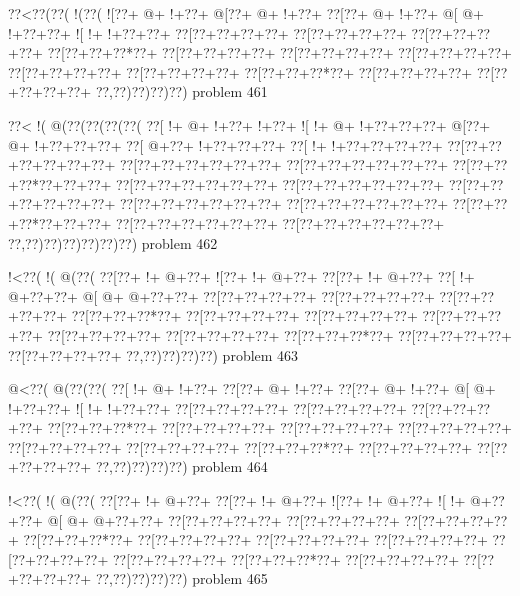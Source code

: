 \vbox{\vbox{\goo
\0??<\0??(\0??(\- !(\0??(
\- ![\0??+\- @+\- !+\0??+
\- @[\0??+\- @+\- !+\0??+
\0??[\0??+\- @+\- !+\0??+
\- @[\- @+\- !+\0??+\0??+
\- ![\- !+\- !+\0??+\0??+
\0??[\0??+\0??+\0??+\0??+
\0??[\0??+\0??+\0??+\0??+
\0??[\0??+\0??+\0??+\0??+
\0??[\0??+\0??+\0??*\0??+
\0??[\0??+\0??+\0??+\0??+
\0??[\0??+\0??+\0??+\0??+
\0??[\0??+\0??+\0??+\0??+
\0??[\0??+\0??+\0??+\0??+
\0??[\0??+\0??+\0??+\0??+
\0??[\0??+\0??+\0??*\0??+
\0??[\0??+\0??+\0??+\0??+
\0??[\0??+\0??+\0??+\0??+
\0??,\0??)\0??)\0??)\0??)
}
\hfil problem 461\hfil\break
}

\vbox{\vbox{\goo
\0??<\- !(\- @(\0??(\0??(\0??(\0??(
\0??[\- !+\- @+\- !+\0??+\- !+\0??+
\- ![\- !+\- @+\- !+\0??+\0??+\0??+
\- @[\0??+\- @+\- !+\0??+\0??+\0??+
\0??[\- @+\0??+\- !+\0??+\0??+\0??+
\0??[\- !+\- !+\0??+\0??+\0??+\0??+
\0??[\0??+\0??+\0??+\0??+\0??+\0??+
\0??[\0??+\0??+\0??+\0??+\0??+\0??+
\0??[\0??+\0??+\0??+\0??+\0??+\0??+
\0??[\0??+\0??+\0??*\0??+\0??+\0??+
\0??[\0??+\0??+\0??+\0??+\0??+\0??+
\0??[\0??+\0??+\0??+\0??+\0??+\0??+
\0??[\0??+\0??+\0??+\0??+\0??+\0??+
\0??[\0??+\0??+\0??+\0??+\0??+\0??+
\0??[\0??+\0??+\0??+\0??+\0??+\0??+
\0??[\0??+\0??+\0??*\0??+\0??+\0??+
\0??[\0??+\0??+\0??+\0??+\0??+\0??+
\0??[\0??+\0??+\0??+\0??+\0??+\0??+
\0??,\0??)\0??)\0??)\0??)\0??)\0??)
}
\hfil problem 462\hfil\break
}

\vbox{\vbox{\goo
\- !<\0??(\- !(\- @(\0??(
\0??[\0??+\- !+\- @+\0??+
\- ![\0??+\- !+\- @+\0??+
\0??[\0??+\- !+\- @+\0??+
\0??[\- !+\- @+\0??+\0??+
\- @[\- @+\- @+\0??+\0??+
\0??[\0??+\0??+\0??+\0??+
\0??[\0??+\0??+\0??+\0??+
\0??[\0??+\0??+\0??+\0??+
\0??[\0??+\0??+\0??*\0??+
\0??[\0??+\0??+\0??+\0??+
\0??[\0??+\0??+\0??+\0??+
\0??[\0??+\0??+\0??+\0??+
\0??[\0??+\0??+\0??+\0??+
\0??[\0??+\0??+\0??+\0??+
\0??[\0??+\0??+\0??*\0??+
\0??[\0??+\0??+\0??+\0??+
\0??[\0??+\0??+\0??+\0??+
\0??,\0??)\0??)\0??)\0??)
}
\hfil problem 463\hfil\break
}

\vbox{\vbox{\goo
\- @<\0??(\- @(\0??(\0??(
\0??[\- !+\- @+\- !+\0??+
\0??[\0??+\- @+\- !+\0??+
\0??[\0??+\- @+\- !+\0??+
\- @[\- @+\- !+\0??+\0??+
\- ![\- !+\- !+\0??+\0??+
\0??[\0??+\0??+\0??+\0??+
\0??[\0??+\0??+\0??+\0??+
\0??[\0??+\0??+\0??+\0??+
\0??[\0??+\0??+\0??*\0??+
\0??[\0??+\0??+\0??+\0??+
\0??[\0??+\0??+\0??+\0??+
\0??[\0??+\0??+\0??+\0??+
\0??[\0??+\0??+\0??+\0??+
\0??[\0??+\0??+\0??+\0??+
\0??[\0??+\0??+\0??*\0??+
\0??[\0??+\0??+\0??+\0??+
\0??[\0??+\0??+\0??+\0??+
\0??,\0??)\0??)\0??)\0??)
}
\hfil problem 464\hfil\break
}

\vbox{\vbox{\goo
\- !<\0??(\- !(\- @(\0??(
\0??[\0??+\- !+\- @+\0??+
\0??[\0??+\- !+\- @+\0??+
\- ![\0??+\- !+\- @+\0??+
\- ![\- !+\- @+\0??+\0??+
\- @[\- @+\- @+\0??+\0??+
\0??[\0??+\0??+\0??+\0??+
\0??[\0??+\0??+\0??+\0??+
\0??[\0??+\0??+\0??+\0??+
\0??[\0??+\0??+\0??*\0??+
\0??[\0??+\0??+\0??+\0??+
\0??[\0??+\0??+\0??+\0??+
\0??[\0??+\0??+\0??+\0??+
\0??[\0??+\0??+\0??+\0??+
\0??[\0??+\0??+\0??+\0??+
\0??[\0??+\0??+\0??*\0??+
\0??[\0??+\0??+\0??+\0??+
\0??[\0??+\0??+\0??+\0??+
\0??,\0??)\0??)\0??)\0??)
}
\hfil problem 465\hfil\break
}

